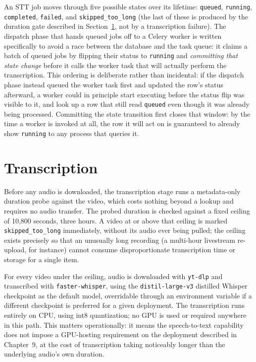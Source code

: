 An STT job moves through five possible states over its lifetime: \texttt{queued}, \texttt{running}, \texttt{completed}, \texttt{failed}, and \texttt{skipped\_too\_long} (the last of these is produced by the duration gate described in Section~\ref{sec:deep-media-transcription}, not by a transcription failure). The dispatch phase that hands queued jobs off to a Celery worker is written specifically to avoid a race between the database and the task queue: it claims a batch of queued jobs by flipping their status to \texttt{running} and \emph{committing that state change} before it calls the worker task that will actually perform the transcription. This ordering is deliberate rather than incidental: if the dispatch phase instead queued the worker task first and updated the row's status afterward, a worker could in principle start executing before the status flip was visible to it, and look up a row that still read \texttt{queued} even though it was already being processed. Committing the state transition first closes that window: by the time a worker is invoked at all, the row it will act on is guaranteed to already show \texttt{running} to any process that queries it.

\section{Transcription}
\label{sec:deep-media-transcription}

Before any audio is downloaded, the transcription stage runs a metadata-only duration probe against the video, which costs nothing beyond a lookup and requires no audio transfer. The probed duration is checked against a fixed ceiling of 10{,}800 seconds, three hours. A video at or above that ceiling is marked \texttt{skipped\_too\_long} immediately, without its audio ever being pulled; the ceiling exists precisely so that an unusually long recording (a multi-hour livestream re-upload, for instance) cannot consume disproportionate transcription time or storage for a single item.

For every video under the ceiling, audio is downloaded with \texttt{yt-dlp} and transcribed with \texttt{faster-whisper}, using the \texttt{distil-large-v3} distilled Whisper checkpoint as the default model, overridable through an environment variable if a different checkpoint is preferred for a given deployment. The transcription runs entirely on CPU, using int8 quantization; no GPU is used or required anywhere in this path. This matters operationally: it means the speech-to-text capability does not impose a GPU-hosting requirement on the deployment described in Chapter~9, at the cost of transcription taking noticeably longer than the underlying audio's own duration.


